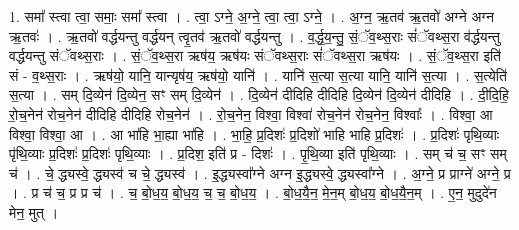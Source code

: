 \documentclass[17pt]{extarticle}
\begin{document}
1. समा᳚ स्त्वा त्वा॒ समाः॒ समा᳚ स्त्वा । . त्वा॒ ऽग्ने॒ अ॒ग्ने॒ त्वा॒ त्वा॒ ऽग्ने॒ । . अ॒ग्न॒ ऋ॒तव॑ ऋ॒तवो॑ अग्ने अग्न ऋ॒तवः॑ । . ऋ॒तवो॑ वर्द्धयन्तु वर्द्धयन् त्वृ॒तव॑ ऋ॒तवो॑ वर्द्धयन्तु । . व॒र्द्ध॒य॒न्तु॒ सं॒ॅव॒थ्स॒राः सं॑ॅवथ्स॒रा व॑र्द्धयन्तु वर्द्धयन्तु संॅवथ्स॒राः । . सं॒ॅव॒थ्स॒रा ऋष॑य॒ ऋष॑यः संॅवथ्स॒राः सं॑ॅवथ्स॒रा ऋष॑यः । . सं॒ॅव॒थ्स॒रा इति॑ सं - व॒थ्स॒राः । . ऋष॑यो॒ यानि॒ यान्यृष॑य॒ ऋष॑यो॒ यानि॑ । . यानि॑ स॒त्या स॒त्या यानि॒ यानि॑ स॒त्या । . स॒त्येति॑ स॒त्या । . सम् दि॒व्येन॑ दि॒व्येन॒ सꣳ सम् दि॒व्येन॑ । . दि॒व्येन॑ दीदिहि दीदिहि दि॒व्येन॑ दि॒व्येन॑ दीदिहि । . दी॒दि॒हि॒ रो॒च॒नेन॑ रोच॒नेन॑ दीदिहि दीदिहि रोच॒नेन॑ । . रो॒च॒नेन॒ विश्वा॒ विश्वा॑ रोच॒नेन॑ रोच॒नेन॒ विश्वाः᳚ । . विश्वा॒ आ विश्वा॒ विश्वा॒ आ । . आ भा॑हि भा॒ह्या भा॑हि । . भा॒हि॒ प्र॒दिशः॑ प्र॒दिशो॑ भाहि भाहि प्र॒दिशः॑ । . प्र॒दिशः॑ पृथि॒व्याः पृ॑थि॒व्याः प्र॒दिशः॑ प्र॒दिशः॑ पृथि॒व्याः । . प्र॒दिश॒ इति॑ प्र - दिशः॑ । . पृ॒थि॒व्या इति॑ पृथि॒व्याः । . सम् च॑ च॒ सꣳ सम् च॑ । . चे॒ द्ध्यस्वे॒ द्ध्यस्व॑ च चे॒ द्ध्यस्व॑ । . इ॒द्ध्यस्वा᳚ग्ने अग्न इ॒द्ध्यस्वे॒ द्ध्यस्वा᳚ग्ने । . अ॒ग्ने॒ प्र प्राग्ने॑ अग्ने॒ प्र । . प्र च॑ च॒ प्र प्र च॑ । . च॒ बो॒ध॒य॒ बो॒ध॒य॒ च॒ च॒ बो॒ध॒य॒ । . बो॒ध॒यै॒न॒ मे॒न॒म् बो॒ध॒य॒ बो॒ध॒यै॒न॒म् । . ए॒न॒ मुदुदे॑न मेन॒ मुत् । \newline
\end{document}
